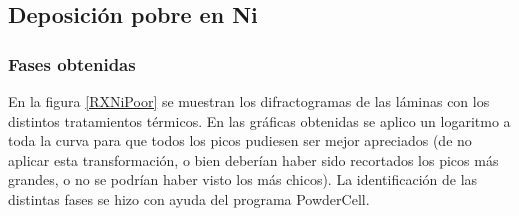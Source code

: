 \documentclass{article}
\theoremstyle{definition}
\theoremstyle{remark}
\begin{document}
\subsection{Deposición pobre en Ni}
\subsubsection{Fases obtenidas}
En la figura \ref{RXNiPoor} se muestran los difractogramas de las láminas con los distintos tratamientos térmicos. En las gráficas obtenidas se aplico un logaritmo a toda la curva para que todos los picos pudiesen ser mejor apreciados (de no aplicar esta transformación, o bien deberían haber sido recortados los picos más grandes, o no se podrían haber visto los más chicos). La identificación de las distintas fases se hizo con ayuda del programa PowderCell.
\end{document}
